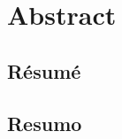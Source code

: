 
\section*{Abstract}




\begin{otherlanguage}{french}

\section*{Résumé}



\end{otherlanguage}

\begin{otherlanguage}{portuguese}

\section*{Resumo}



\end{otherlanguage}
